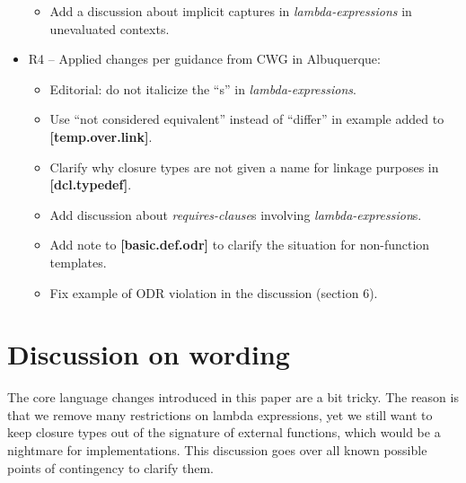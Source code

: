 \documentclass{wg21}
\begin{document}
\begin{itemize}
\begin{itemize}
      \item Add a discussion about implicit captures in \textit{lambda-expressions}
            in unevaluated contexts.
    \end{itemize}
  \item R4 -- Applied changes per guidance from CWG in Albuquerque:
    \begin{itemize}
      \item Editorial: do not italicize the ``s'' in \textit{lambda-expressions}.
      \item Use ``not considered equivalent'' instead of ``differ'' in example
            added to \textbf{[temp.over.link]}.
      \item Clarify why closure types are not given a name for linkage purposes
            in \textbf{[dcl.typedef]}.
      \item Add discussion about \textit{requires-clause}s involving
            \textit{lambda-expression}s.
      \item Add note to \textbf{[basic.def.odr]} to clarify the situation for
            non-function templates.
      \item Fix example of ODR violation in the discussion (section 6).
    \end{itemize}
\end{itemize}

\section{Discussion on wording}
The core language changes introduced in this paper are a bit tricky. The reason
is that we remove many restrictions on lambda expressions, yet we still want to
keep closure types out of the signature of external functions, which would be
a nightmare for implementations. This discussion goes over all known possible
points of contingency to clarify them.
\end{document}
